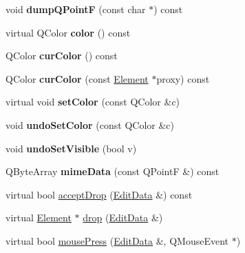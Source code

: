 \begin{DoxyCompactItemize}
\item 
\mbox{\label{class_ms_1_1_element_a457eea698729e033dbe4949e38b348fa}} 
void {\bfseries dump\+Q\+PointF} (const char $\ast$) const
\item 
\mbox{\label{class_ms_1_1_element_aaf1b495b1a35846de518c268fc856afd}} 
virtual Q\+Color {\bfseries color} () const
\item 
\mbox{\label{class_ms_1_1_element_a9de808f86f2dac5c4f7c4f9adc4d1d69}} 
Q\+Color {\bfseries cur\+Color} () const
\item 
\mbox{\label{class_ms_1_1_element_a1aa2bbcaf4a29fe0f0c7723940485321}} 
Q\+Color {\bfseries cur\+Color} (const \hyperlink{class_ms_1_1_element}{Element} $\ast$proxy) const
\item 
\mbox{\label{class_ms_1_1_element_a22907ac84ae65fb5b6c3bc2b14f3b23c}} 
virtual void {\bfseries set\+Color} (const Q\+Color \&c)
\item 
\mbox{\label{class_ms_1_1_element_aa9328fefa5648b5bc3f020b6cf481f38}} 
void {\bfseries undo\+Set\+Color} (const Q\+Color \&c)
\item 
\mbox{\label{class_ms_1_1_element_a4033806e37a8a0bd95f75e06fb6d1286}} 
void {\bfseries undo\+Set\+Visible} (bool v)
\item 
\mbox{\label{class_ms_1_1_element_a90f21ba358732f3c471069758d84a76f}} 
Q\+Byte\+Array {\bfseries mime\+Data} (const Q\+PointF \&) const
\item 
virtual bool \hyperlink{class_ms_1_1_element_a35614445f0bc2212cbcc75c3f5810543}{accept\+Drop} (\hyperlink{class_ms_1_1_edit_data}{Edit\+Data} \&) const
\item 
virtual \hyperlink{class_ms_1_1_element}{Element} $\ast$ \hyperlink{class_ms_1_1_element_a0ca69a9fb48e7b9fb481aacaf3860032}{drop} (\hyperlink{class_ms_1_1_edit_data}{Edit\+Data} \&)
\item 
virtual bool \hyperlink{class_ms_1_1_element_a794cd19d8af68dde867bab5a0bf75344}{mouse\+Press} (\hyperlink{class_ms_1_1_edit_data}{Edit\+Data} \&, Q\+Mouse\+Event $\ast$)
\item 

\end{DoxyCompactItemize}
